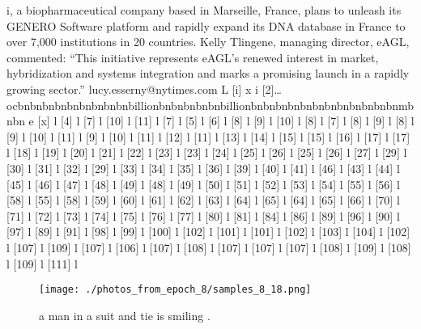 \documentclass{article}%
\begin{document}
i, a biopharmaceutical company based in Marseille, France, plans to unleash its GENERO Software platform and rapidly expand its DNA database in France to over 7,000 institutions in 20 countries.\newline%
Kelly Tlingene, managing director, eAGL, commented: “This initiative represents eAGL’s renewed interest in market, hybridization and systems integration and marks a promising launch in a rapidly growing sector.”\newline%
lucy.esserny@nytimes.com\newline%
L {[}i{]} x i {[}2{]}… ocbnbnbnbnbnbnbnbnbnbillionbnbnbnbnbnbillionbnbnbnbnbnbnbnbnbnbnbnbnmbnbn\newline%
e {[}x{]} l {[}4{]} l {[}7{]} l {[}10{]} l {[}11{]} l {[}7{]} l {[}5{]} l {[}6{]} l {[}8{]} l {[}9{]} l {[}10{]} l {[}8{]} l {[}7{]} l {[}8{]} l {[}9{]} l {[}8{]} l {[}9{]} l {[}10{]} l {[}11{]} l {[}9{]} l {[}10{]} l {[}11{]} l {[}12{]} l {[}11{]} l {[}13{]} l {[}14{]} l {[}15{]} l {[}15{]} l {[}16{]} l {[}17{]} l {[}17{]} l {[}18{]} l {[}19{]} l {[}20{]} l {[}21{]} l {[}22{]} l {[}23{]} l {[}23{]} l {[}24{]} l {[}25{]} l {[}26{]} l {[}25{]} l {[}26{]} l {[}27{]} l {[}29{]} l {[}30{]} l {[}31{]} l {[}32{]} l {[}29{]} l {[}33{]} l {[}34{]} l {[}35{]} l {[}36{]} l {[}39{]} l {[}40{]} l {[}41{]} l {[}46{]} l {[}43{]} l {[}44{]} l {[}45{]} l {[}46{]} l {[}47{]} l {[}48{]} l {[}49{]} l {[}48{]} l {[}49{]} l {[}50{]} l {[}51{]} l {[}52{]} l {[}53{]} l {[}54{]} l {[}55{]} l {[}56{]} l {[}58{]} l {[}55{]} l {[}58{]} l {[}59{]} l {[}60{]} l {[}61{]} l {[}62{]} l {[}63{]} l {[}64{]} l {[}65{]} l {[}64{]} l {[}65{]} l {[}66{]} l {[}70{]} l {[}71{]} l {[}72{]} l {[}73{]} l {[}74{]} l {[}75{]} l {[}76{]} l {[}77{]} l {[}80{]} l {[}81{]} l {[}84{]} l {[}86{]} l {[}89{]} l {[}96{]} l {[}90{]} l {[}97{]} l {[}89{]} l {[}91{]} l {[}98{]} l {[}99{]} l {[}100{]} l {[}102{]} l {[}101{]} l {[}101{]} l {[}102{]} l {[}103{]} l {[}104{]} l {[}102{]} l {[}107{]} l {[}109{]} l {[}107{]} l {[}106{]} l {[}107{]} l {[}108{]} l {[}107{]} l {[}107{]} l {[}107{]} l {[}108{]} l {[}109{]} l {[}108{]} l {[}109{]} l {[}111{]} l

%


\begin{figure}[h!]%
\centering%
\texttt{[image: ./photos\_from\_epoch\_8/samples\_8\_18.png]}%
\caption{a man in a suit and tie is smiling .}%
\end{figure}

%
\end{document}
